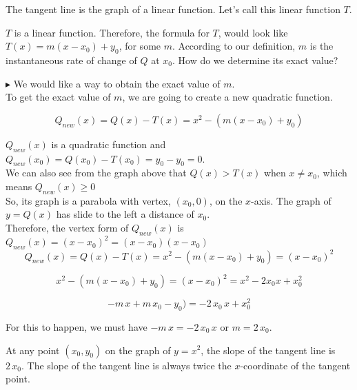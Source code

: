 \documentclass{ximera}
\begin{document}
The tangent line is the graph of a linear function. Let's call this linear function $T$.


$T$ is a linear function. Therefore, the formula for $T$, would look like $T(x) = m(x - x_0) + y_0$, for some $m$.  According to our definition, $m$ is the instantaneous rate of change of $Q$ at $x_0$.  How do we determine its exact value?


$\blacktriangleright$ We would like a way to obtain the exact value of $m$. \\



To get the exact value of $m$, we are going to create a new quadratic function.



\begin{explanation}


\[
Q_{new}(x) = Q(x) - T(x) = x^2 - (m(x - x_0) + y_0)
\]



$Q_{new}(x)$ is a quadratic function and $Q_{new}(x_0) = Q(x_0) - T(x_0) = y_0 - y_0 = 0$. \\

We can also see from the graph above that $Q(x) > T(x)$ when $x \ne x_0$, which means $Q_{new}(x) \geq 0$\\


So, its graph is a parabola with vertex, $(x_0, 0)$, on the $x$-axis.  The graph of $y = Q(x)$ has slide to the left a distance of $x_0$.  \\


Therefore, the vertex form of $Q_{new}(x)$ is $Q_{new}(x) = (x - x_0)^2 = (x - x_0)(x - x_0)$  \\






\[
Q_{new}(x) = Q(x) - T(x) = x^2 - (m(x - x_0) + y_0) = (x - x_0)^2
\]




\[
x^2 - (m(x - x_0) + y_0) = (x - x_0)^2 = x^2 - 2 x_0 x + x_0^2
\]



\[
 -m \, x + m \, x_0 - y_0) =   - 2 \, x_0 \, x + x_0^2
\]


For this to happen, we must have $-m \, x = - 2 \, x_0 \, x$ or \textbf{$m = 2 \, x_0$}. \\


\end{explanation}


At any point $(x_0, y_0)$ on the graph of $y = x^2$, the slope of the tangent line is $2 \, x_0$.  The slope of the tangent line is always twice the $x$-coordinate of the tangent point.
\end{document}

